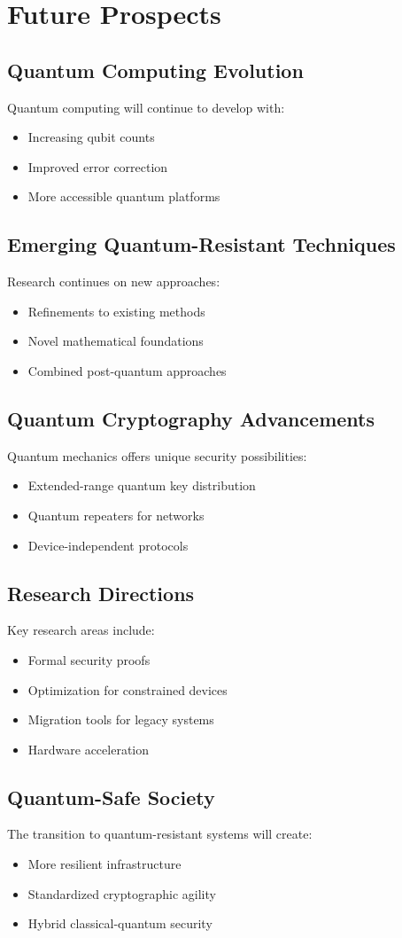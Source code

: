\chapter{Future Prospects}
\label{chap:future-prospects}

\section{Quantum Computing Evolution}
Quantum computing will continue to develop with:
\begin{itemize}
    \item Increasing qubit counts
    \item Improved error correction
    \item More accessible quantum platforms
\end{itemize}

\section{Emerging Quantum-Resistant Techniques}
Research continues on new approaches:
\begin{itemize}
    \item Refinements to existing methods
    \item Novel mathematical foundations
    \item Combined post-quantum approaches
\end{itemize}

\section{Quantum Cryptography Advancements}
Quantum mechanics offers unique security possibilities:
\begin{itemize}
    \item Extended-range quantum key distribution
    \item Quantum repeaters for networks
    \item Device-independent protocols
\end{itemize}

\section{Research Directions}
Key research areas include:
\begin{itemize}
    \item Formal security proofs
    \item Optimization for constrained devices
    \item Migration tools for legacy systems
    \item Hardware acceleration
\end{itemize}

\section{Quantum-Safe Society}
The transition to quantum-resistant systems will create:
\begin{itemize}
    \item More resilient infrastructure
    \item Standardized cryptographic agility
    \item Hybrid classical-quantum security
\end{itemize}